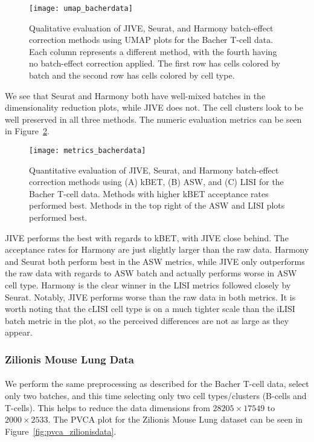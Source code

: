 \documentclass[
12pt, %
letterpaper, %
oneside, %
headinclude,footinclude, %
BCOR5mm, %
]{scrartcl}
\begin{document}
\begin{figure}[H]
    \centering 
    \texttt{[image: umap\_bacherdata]} 
    \caption[UMAP Plots for the Bacher T-Cell Data]{Qualitative evaluation of JIVE, Seurat, and Harmony batch-effect correction methods using UMAP plots for the Bacher T-cell data. Each column represents a different method, with the fourth having no batch-effect correction applied. The first row has cells colored by batch and the second row has cells colored by cell type.}
    \label{fig:umap_bacherdata} 
\end{figure}

We see that Seurat and Harmony both have well-mixed batches in the dimensionality reduction plots, while JIVE does not. The cell clusters look to be well preserved in all three methods. The numeric evaluation metrics can be seen in Figure~\ref{fig:metrics_bacherdata}.

\begin{figure}[H]
    \centering 
    \texttt{[image: metrics\_bacherdata]} 
    \caption[Metrics for the Bacher T-Cell Data]{Quantitative evaluation of JIVE, Seurat, and Harmony batch-effect correction methods using (A) kBET, (B) ASW, and (C) LISI for the Bacher T-cell data. Methods with higher kBET acceptance rates performed best. Methods in the top right of the ASW and LISI plots performed best.}
    \label{fig:metrics_bacherdata} 
\end{figure}

JIVE performs the best with regards to kBET, with JIVE close behind. The acceptance rates for Harmony are just slightly larger than the raw data. Harmony and Seurat both perform best in the ASW metrics, while JIVE only outperforms the raw data with regards to ASW batch and actually performs worse in ASW cell type. Harmony is the clear winner in the LISI metrics followed closely by Seurat. Notably, JIVE performs worse than the raw data in both metrics. It is worth noting that the cLISI cell type is on a much tighter scale than the iLISI batch metric in the plot, so the perceived differences are not as large as they appear.


\subsubsection*{Zilionis Mouse Lung Data}

\paragraph*{}
We perform the same preprocessing as described for the Bacher T-cell data, select only two batches, and this time selecting only two cell types/clusters (B-cells and T-cells). This helps to reduce the data dimensions from $28205 \times 17549$ to $2000 \times 2533$. The PVCA plot for the Zilionis Mouse Lung dataset can be seen in Figure~\ref{fig:pvca_zilionisdata}.
\end{document}
